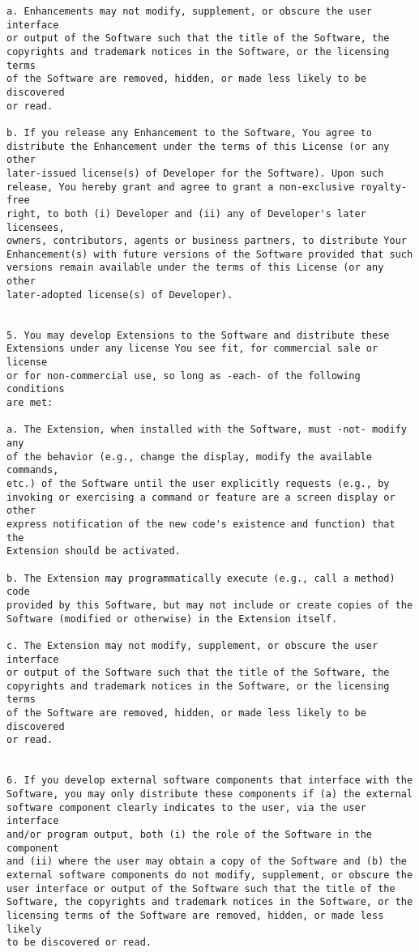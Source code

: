 \documentclass{report}
\begin{document}
{\begin{verbatim}
a. Enhancements may not modify, supplement, or obscure the user interface 
or output of the Software such that the title of the Software, the 
copyrights and trademark notices in the Software, or the licensing terms 
of the Software are removed, hidden, or made less likely to be discovered 
or read. 

b. If you release any Enhancement to the Software, You agree to 
distribute the Enhancement under the terms of this License (or any other 
later-issued license(s) of Developer for the Software). Upon such 
release, You hereby grant and agree to grant a non-exclusive royalty-free 
right, to both (i) Developer and (ii) any of Developer's later licensees, 
owners, contributors, agents or business partners, to distribute Your 
Enhancement(s) with future versions of the Software provided that such 
versions remain available under the terms of this License (or any other 
later-adopted license(s) of Developer). 


5. You may develop Extensions to the Software and distribute these 
Extensions under any license You see fit, for commercial sale or license 
or for non-commercial use, so long as -each- of the following conditions 
are met: 

a. The Extension, when installed with the Software, must -not- modify any 
of the behavior (e.g., change the display, modify the available commands, 
etc.) of the Software until the user explicitly requests (e.g., by 
invoking or exercising a command or feature are a screen display or other 
express notification of the new code's existence and function) that the 
Extension should be activated. 

b. The Extension may programmatically execute (e.g., call a method) code 
provided by this Software, but may not include or create copies of the 
Software (modified or otherwise) in the Extension itself. 

c. The Extension may not modify, supplement, or obscure the user interface 
or output of the Software such that the title of the Software, the 
copyrights and trademark notices in the Software, or the licensing terms 
of the Software are removed, hidden, or made less likely to be discovered 
or read.


6. If you develop external software components that interface with the 
Software, you may only distribute these components if (a) the external 
software component clearly indicates to the user, via the user interface 
and/or program output, both (i) the role of the Software in the component 
and (ii) where the user may obtain a copy of the Software and (b) the 
external software components do not modify, supplement, or obscure the 
user interface or output of the Software such that the title of the 
Software, the copyrights and trademark notices in the Software, or the 
licensing terms of the Software are removed, hidden, or made less likely 
to be discovered or read.



\end{verbatim}}
\end{document}
